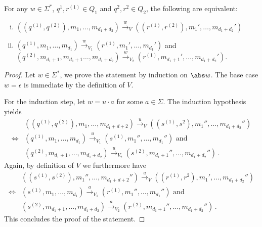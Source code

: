 \begin{lemma}\label{lem:intersect-reach}
  For any $w\in \Sigma^*$, $q^{1},r^{(1)}\in Q_1$ and $q^{2},r^{2}\in
  Q_2$, the following are equivalent:
%
  \begin{enumerate}[(i)]
  \item
    $((q^{(1)},q^{(2)}),m_1,\dots,m_{d_1+d_2})\xrightarrow{w}_{V}
    ((r^{(1)}, r^{(2)}),m_1',\dots,m_{d_1+d_2}')$
  \item
  $(q^{(1)},m_1,\dots,m_{d_1})\xrightarrow{w}_{V_1}
    (r^{(1)},m_1',\dots,m_{d_1}')$ and
    $(q^{(2)},m_{d_1+1},m_{d_1+1}\dots,m_{d_1+d_2})\xrightarrow{w}_{V_2}
    (r^{(1)},m_{d_1+1}',\dots,m_{d_1+d_2}')$.
  \end{enumerate}
\end{lemma}
\begin{proof}
  Let $w\in \Sigma^*$, we prove the statement by induction on $\abs
  w$. The base case $w=\epsilon$ is immediate by the definition of
  $V$.

  For the induction step, let $w=u\cdot a$ for some
  $a\in\Sigma$. The induction hypothesis yields
  \begin{align*}
    & ((q^{(1)},q^{(2)}),m_1,\dots,m_{d_1+d+2})\xrightarrow{u}_V
    ((s^{(1)}, s^{2}),m_1'',\dots,m_{d_1+d_2}'')\\
    \iff & (q^{(1)},m_1,\dots,m_{d_1})\xrightarrow{u}_{V_1}
    (s^{(1)},m_1'',\dots,m_{d_1}'') \text{ and }\\
    & (q^{(2)},m_{d_1+1},\dots,m_{d_1+ d_2})\xrightarrow{u}_{V_2}
    (s^{(2)},m_{d_1+1}'',\dots,m_{d_1+d_2}'')\,.
  \end{align*}
  Again, by definition of $V$ we furthermore have
  \begin{align*}
    & ((s^{(1)},s^{(2)}),m_1'',\dots,m_{d_1+d+2}'')\xrightarrow{a}_V
    ((r^{(1)}, r^{2}),m_1',\dots,m_{d_1+d_2}'')\\
    \iff & (s^{(1)},m_1,\dots,m_{d_1})\xrightarrow{a}_{V_1}
    (r^{(1)},m_1'',\dots,m_{d_1}'') \text{ and }\\
    & (s^{(2)},m_{d_1+1},\dots,m_{d_1+ d_2})\xrightarrow{a}_{V_2}
    (r^{(2)},m_{d_1+1}'',\dots,m_{d_1+d_2}'')\,.
  \end{align*}
  This concludes the proof of the statement.
\end{proof}


